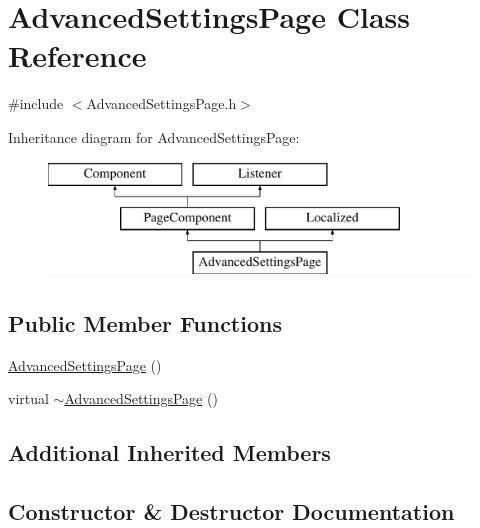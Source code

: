 \hypertarget{classAdvancedSettingsPage}{}\section{Advanced\+Settings\+Page Class Reference}
\label{classAdvancedSettingsPage}


{\ttfamily \#include $<$Advanced\+Settings\+Page.\+h$>$}

Inheritance diagram for Advanced\+Settings\+Page\+:\begin{figure}[H]
\begin{center}
\leavevmode
\includegraphics[height=3.000000cm]{classAdvancedSettingsPage}
\end{center}
\end{figure}
\subsection*{Public Member Functions}
\begin{DoxyCompactItemize}
\item 
\mbox{\hyperlink{classAdvancedSettingsPage_ab35a9d7e92b5e6c103073f0e8e3ca6d4}{Advanced\+Settings\+Page}} ()
\item 
virtual \mbox{\hyperlink{classAdvancedSettingsPage_a8252f2774ca5fc6fd59c73e8ac1ff761}{$\sim$\+Advanced\+Settings\+Page}} ()
\end{DoxyCompactItemize}
\subsection*{Additional Inherited Members}


\subsection{Constructor \& Destructor Documentation}
\mbox{\label{classAdvancedSettingsPage_ab35a9d7e92b5e6c103073f0e8e3ca6d4}} 
